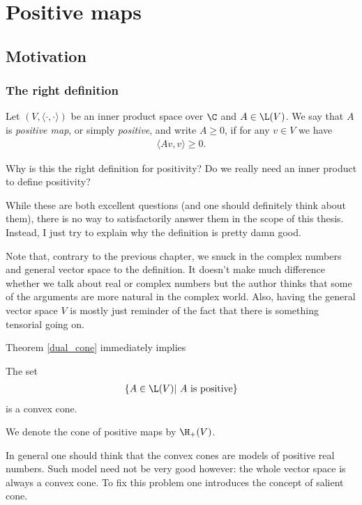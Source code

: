 \chapter{Positive maps}

\section{Motivation}

\subsection{The right definition}

\begin{maar}
	Let $(V, \langle \cdot, \cdot \rangle)$ be an inner product space over $\C$ and $A \in \L(V)$. We say that $A$ is \textit{positive map}, or simply \textit{positive}, and write $A \geq 0$, if for any $v \in V$ we have
	\begin{align*}
		\langle A v, v \rangle \geq 0.
	\end{align*}
\end{maar}

Why is this the right definition for positivity? Do we really need an inner product to define positivity?

While these are both excellent questions (and one should definitely think about them), there is no way to satisfactorily answer them in the scope of this thesis. Instead, I just try to explain why the definition is pretty damn good.

Note that, contrary to the previous chapter, we snuck in the complex numbers and general vector space to the definition. It doesn't make much difference whether we talk about real or complex numbers but the author thinks that some of the arguments are more natural in the complex world. Also, having the general vector space $V$ is mostly just reminder of the fact that there is something tensorial going on.

Theorem \ref{dual_cone} immediately implies

\begin{lause}
The set
\begin{align*}
	\{A \in \L(V) | \text{ $A$ is positive} \}
\end{align*}
is a convex cone.
\end{lause}

We denote the cone of positive maps by $\H_{+}(V)$.

In general one should think that the convex cones are models of positive real numbers. Such model need not be very good however: the whole vector space is always a convex cone. To fix this problem one introduces the concept of salient cone.

